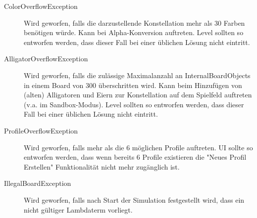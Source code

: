 \begin{description}
\item[ColorOverflowException] Wird geworfen, falls die darzustellende Konstellation mehr als 30 Farben benötigen würde.  Kann bei Alpha-Konversion auftreten. Level sollten so entworfen werden, dass dieser Fall bei einer üblichen Lösung nicht eintritt.
\item[AlligatorOverflowException] Wird geworfen, falls die zulässige Maximalanzahl an InternalBoardObjects in einem Board von 300 überschritten wird. Kann beim Hinzufügen von (alten) Alligatoren und Eiern zur Konstellation auf dem Spielfeld auftreten (v.a. im Sandbox-Modus).  Level sollten so entworfen werden, dass dieser Fall bei einer üblichen Lösung nicht eintritt.
\item[ProfileOverflowExeption] Wird geworfen, falls mehr als die 6 möglichen Profile auftreten. UI sollte so entworfen werden, dass wenn bereits 6 Profile existieren die "Neues Profil Erstellen" Funktionalität nicht mehr zugänglich ist.
\item[IllegalBoardException] Wird geworfen, falls nach Start der Simulation festgestellt wird, dass ein nicht gültiger Lambdaterm vorliegt.
\end{description}